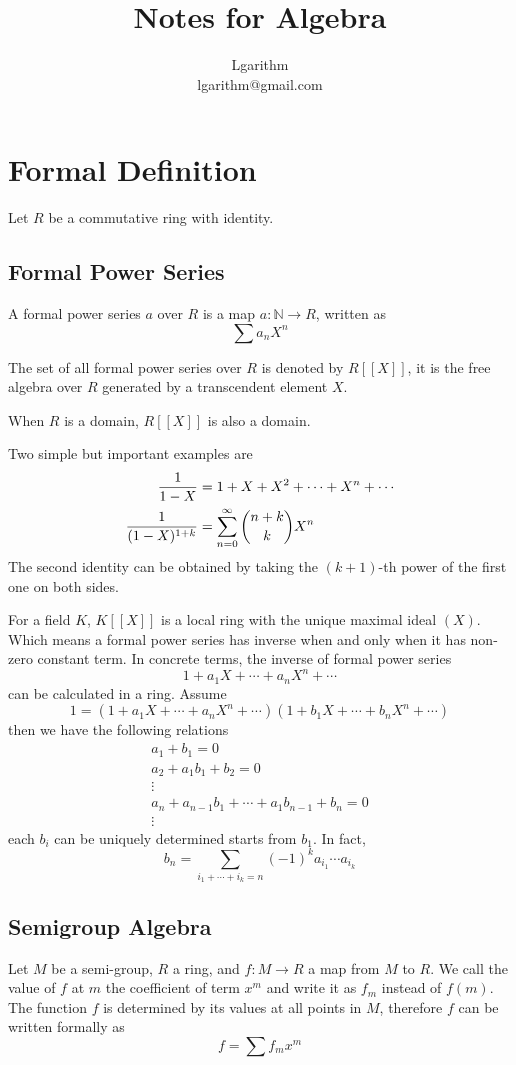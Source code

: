 \documentclass{article}
\title{Notes for Algebra}
\author{Lgarithm\\\mbox{lgarithm@gmail.com}}
\begin{document}
\maketitle
\newpage
\tableofcontents
\newpage


\section{Formal Definition}
Let $R$ be a commutative ring with identity.

\subsection{Formal Power Series}
A formal power series $a$ over $R$ is a map $a : \mathbb N \to R$,
written as $$\sum a_n X^n$$

The set of all formal power series over $R$ is denoted by $R[[X]]$,
it is the free algebra over $R$ generated by a transcendent element $X$.

When $R$ is a domain, $R[[X]]$ is also a domain.

Two simple but important examples are
\begin{align*}
  {1 \over 1 - X} &= 1 + X + X^2 + \cdots + X^n + \cdots \\
  {1 \over (1 - X)^{1 + k}} &= \sum_{n = 0}^\infty {n + k \choose k} X^n
\end{align*}
The second identity can be obtained by taking the $(k + 1)$-th power of the first one on both sides.

For a field $K$, $K[[X]]$ is a local ring with the unique maximal ideal $(X)$.
Which means a formal power series has inverse when and only when it has non-zero constant term.
In concrete terms, the inverse of formal power series
$$1 + a_1 X + \cdots + a_n X^n + \cdots$$
can be calculated in a ring. Assume
$$1 = (1 + a_1 X + \cdots + a_n X^n + \cdots) (1 + b_1 X + \cdots + b_n X^n + \cdots)$$
then we have the following relations
\begin{align*}
    a_1 + b_1 = 0 \\
    a_2 + a_1b_1 + b_2 = 0 \\
    \vdots \\
    a_n + a_{n-1}b_1 + \cdots + a_1b_{n-1} + b_n = 0 \\
    \vdots
\end{align*}
each $b_i$ can be uniquely determined starts from $b_1$. In fact,
$$b_n = \sum_{i_1 + \cdots + i_k = n} (-1)^k a_{i_1} \cdots a_{i_k}$$

\subsection{Semigroup Algebra}
Let $M$ be a semi-group, $R$ a ring, and $f : M \to R$ a map from $M$ to $R$.
We call the value of $f$ at $m$ the coefficient of term $x^m$ and write it as $f_m$ instead of $f(m)$.
The function $f$ is determined by its values at all points in $M$, therefore $f$ can be written
formally as $$f = \sum f_m x^m$$
\end{document}
